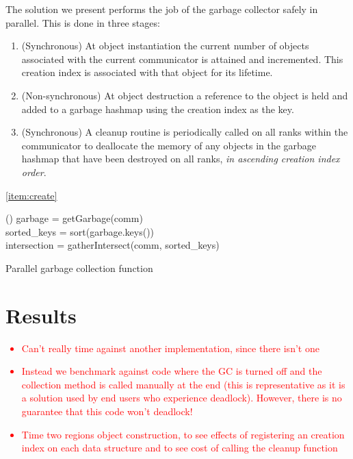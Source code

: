 \documentclass[10pt,journal,compsoc]{IEEEtran}
\newcommand{\jacknotes}[1]{\textcolor{red}{#1}}
\begin{document}
The solution we present performs the job of the garbage collector safely in parallel. This is done in three stages:
\begin{enumerate}
	\item \label{item:create}(Synchronous) At object instantiation the current number of objects associated with the current communicator is attained and incremented. This creation index is associated with that object for its lifetime.
	\item \label{item:destroy}(Non-synchronous) At object destruction a reference to the object is held and added to a garbage hashmap using the creation index as the key.
	\item \label{item:cleanup}(Synchronous) A cleanup routine is periodically called on all ranks within the communicator to deallocate the memory of any objects in the garbage hashmap that have been destroyed on all ranks, \emph{in ascending creation index order}.
\end{enumerate}

\cref{item:create}

\begin{algorithm}[htp]
	\Function(){
		garbage = getGarbage(comm)\\
		sorted\_keys = sort(garbage.keys())\\
		intersection = gatherIntersect(comm, sorted\_keys)\\
	}
	\caption[]{Parallel garbage collection function}
\end{algorithm}

\section{Results}
\label{sec:results}
\jacknotes{
\begin{itemize}
	\item Can't really time against another implementation, since there isn't one
	\item Instead we benchmark against code where the GC is turned off and the collection method is called manually at the end (this is representative as it is a solution used by end users who experience deadlock). However, there is no guarantee that this code won't deadlock!
	\item Time two regions object construction, to see effects of registering an creation index on each data structure and to see cost of calling the cleanup function
\end{itemize}
}
\end{document}
